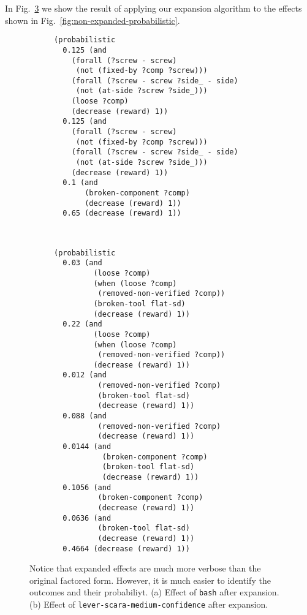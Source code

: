 \documentclass[../root.tex]{subfiles}
\begin{document}
In Fig.~\ref{fig:expanded-probabilistic} we show the result
of applying our expansion algorithm to the
effects shown in Fig.~\ref{fig:non-expanded-probabilistic}.

\begin{figure}[tbhp]
\centering
\begin{subfigure}[b]{0.48\columnwidth}
\begin{lstlisting}[numbers=none]
(probabilistic
  0.125 (and
    (forall (?screw - screw)
     (not (fixed-by ?comp ?screw)))
    (forall (?screw - screw ?side_ - side)
     (not (at-side ?screw ?side_)))
    (loose ?comp)
    (decrease (reward) 1))
  0.125 (and
    (forall (?screw - screw)
     (not (fixed-by ?comp ?screw)))
    (forall (?screw - screw ?side_ - side)
     (not (at-side ?screw ?side_)))
    (decrease (reward) 1))
  0.1 (and
       (broken-component ?comp)
       (decrease (reward) 1))
  0.65 (decrease (reward) 1))
\end{lstlisting}
\caption{}
\label{fig:nested-probabilistic-expanded}
\end{subfigure}
~
\begin{subfigure}[b]{0.48\columnwidth}
\begin{lstlisting}[numbers=none]
(probabilistic
  0.03 (and
	     (loose ?comp)
	     (when (loose ?comp)
	      (removed-non-verified ?comp))
	     (broken-tool flat-sd)
	     (decrease (reward) 1))
  0.22 (and
         (loose ?comp)
         (when (loose ?comp)
          (removed-non-verified ?comp))
         (decrease (reward) 1))
  0.012 (and
          (removed-non-verified ?comp)
          (broken-tool flat-sd)
          (decrease (reward) 1))
  0.088 (and
          (removed-non-verified ?comp)
          (decrease (reward) 1))
  0.0144 (and
           (broken-component ?comp)
           (broken-tool flat-sd)
           (decrease (reward) 1))
  0.1056 (and
		  (broken-component ?comp)
		  (decrease (reward) 1))
  0.0636 (and
          (broken-tool flat-sd)
          (decrease (reward) 1))
  0.4664 (decrease (reward) 1))
\end{lstlisting}
\caption{}
\label{fig:conjunction-probabilistic-expanded}
\end{subfigure}
\caption{
Notice that expanded effects are much more verbose than the original
factored form. However, it is much easier to identify the outcomes and
their probabiliyt.
(a) Effect of \texttt{bash} after expansion.
(b) Effect of \texttt{lever-scara-medium-confidence} after expansion.
}
\label{fig:expanded-probabilistic}
\end{figure}
\end{document}

